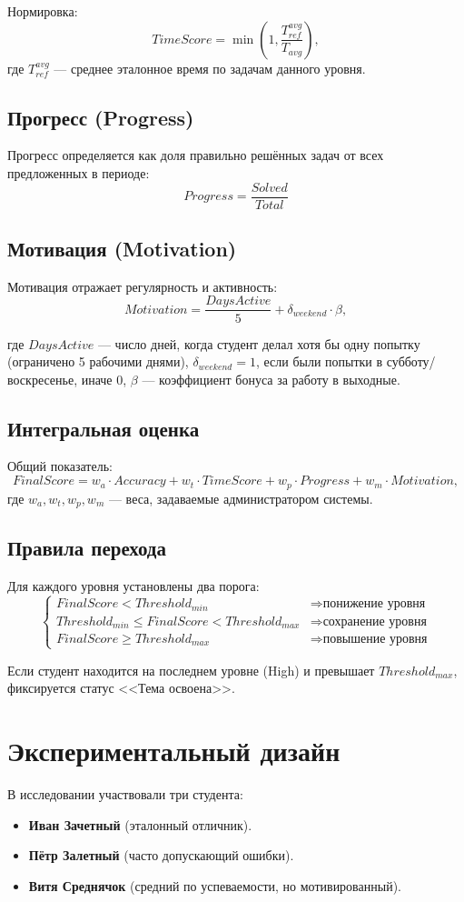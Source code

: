 \documentclass[12pt,a4paper]{article}
\begin{document}
Нормировка:
\[
TimeScore = \min\left(1, \frac{T_{ref}^{avg}}{T_{avg}}\right),
\]
где $T_{ref}^{avg}$ — среднее эталонное время по задачам данного уровня.

\subsection{Прогресс (Progress)}
Прогресс определяется как доля правильно решённых задач от всех предложенных в периоде:
\[
Progress = \frac{Solved}{Total}
\]

\subsection{Мотивация (Motivation)}
Мотивация отражает регулярность и активность:
\[
Motivation = \frac{DaysActive}{5} + \delta_{weekend}\cdot \beta,
\]

где $DaysActive$ — число дней, когда студент делал хотя бы одну попытку (ограничено 5 рабочими днями),  
$\delta_{weekend}=1$, если были попытки в субботу/воскресенье, иначе $0$,  
$\beta$ — коэффициент бонуса за работу в выходные.

\subsection{Интегральная оценка}
Общий показатель:
\[
FinalScore = w_a \cdot Accuracy + w_t \cdot TimeScore + w_p \cdot Progress + w_m \cdot Motivation,
\]
где $w_a, w_t, w_p, w_m$ — веса, задаваемые администратором системы.  

\subsection{Правила перехода}
Для каждого уровня установлены два порога:
\[
\begin{cases}
FinalScore < Threshold_{min} & \Rightarrow \text{понижение уровня} \\
Threshold_{min} \leq FinalScore < Threshold_{max} & \Rightarrow \text{сохранение уровня} \\
FinalScore \geq Threshold_{max} & \Rightarrow \text{повышение уровня}
\end{cases}
\]

Если студент находится на последнем уровне (High) и превышает $Threshold_{max}$, фиксируется статус <<Тема освоена>>.

\section{Экспериментальный дизайн}
В исследовании участвовали три студента:
\begin{itemize}
    \item \textbf{Иван Зачетный} (эталонный отличник).
    \item \textbf{Пётр Залетный} (часто допускающий ошибки).
    \item \textbf{Витя Среднячок} (средний по успеваемости, но мотивированный).
\end{itemize}
\end{document}
